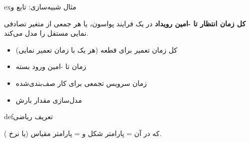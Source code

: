 \begin{PSbox}[breakable]{ex}{مثال شبیه‌سازی: تابع  و }
\begin{Shaded}
\begin{Highlighting}[]
\OperatorTok{;}
\NormalTok{(}\OperatorTok{,} \OperatorTok{,} \OperatorTok{,} \OperatorTok{,} \NormalTok{)}\OperatorTok{;}
 \OperatorTok{;}
\NormalTok{(}\OperatorTok{,} \OperatorTok{,} \OperatorTok{,} \OperatorTok{,} \NormalTok{)}\OperatorTok{;}
\NormalTok{(}\NormalTok{)}\OperatorTok{;} \NormalTok{(}\NormalTok{)}\OperatorTok{;}
\NormalTok{(}\NormalTok{)}\OperatorTok{;}
\NormalTok{(}\OperatorTok{,} \NormalTok{)}\OperatorTok{;}
 \OperatorTok{;}
\end{Highlighting}
\end{Shaded}

\end{PSbox}



\textbf{کل زمان انتظار تا -امین رویداد} در یک فرایند پواسون، یا هر جمعی از  متغیر تصادفی نمایی مستقل را مدل می‌کند.


\begin{itemize}
\tightlist
\item
  کل زمان تعمیر برای  قطعه (هر یک با زمان تعمیر نمایی)
\item
  زمان تا -امین ورود بسته
\item
  زمان سرویس تجمعی برای  کار صف‌بندی‌شده
\item
  مدل‌سازی مقدار بارش
\end{itemize}

\begin{PSbox}[unbreakable]{def}{تعریف ریاضی}

 که در آن \lr{$\alpha$} = پارامتر شکل و \lr{$\beta$} = پارامتر مقیاس (یا نرخ ).

\end{PSbox}

